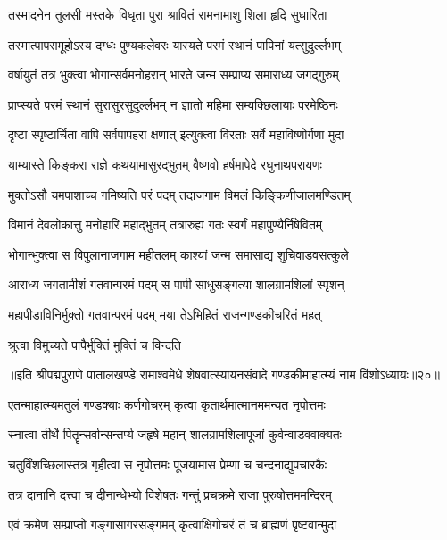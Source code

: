 \twolineshloka
{तस्मादनेन तुलसी मस्तके विधृता पुरा}
{श्रावितं रामनामाशु शिला हृदि सुधारिता}%

\twolineshloka
{तस्मात्पापसमूहोऽस्य दग्धः पुण्यकलेवरः}
{यास्यते परमं स्थानं पापिनां यत्सुदुर्ल्लभम्}%

\twolineshloka
{वर्षायुतं तत्र भुक्त्वा भोगान्सर्वमनोहरान्}
{भारते जन्म सम्प्राप्य समाराध्य जगद्गुरुम्}%

\twolineshloka
{प्राप्स्यते परमं स्थानं सुरासुरसुदुर्ल्लभम्}
{न ज्ञातो महिमा सम्यक्छिलायाः परमेष्ठिनः}%

\twolineshloka
{दृष्टा स्पृष्टार्चिता वापि सर्वपापहरा क्षणात्}
{इत्युक्त्वा विरताः सर्वे महाविष्णोर्गणा मुदा}%

\twolineshloka
{याम्यास्ते किङ्करा राज्ञे कथयामासुरद्भुतम्}
{वैष्णवो हर्षमापेदे रघुनाथपरायणः}%

\twolineshloka
{मुक्तोऽसौ यमपाशाच्च गमिष्यति परं पदम्}
{तदाजगाम विमलं किङ्किणीजालमण्डितम्}%

\twolineshloka
{विमानं देवलोकात्तु मनोहारि महाद्भुतम्}
{तत्रारुह्य गतः स्वर्गं महापुण्यैर्निषेवितम्}%

\twolineshloka
{भोगान्भुक्त्वा स विपुलानाजगाम महीतलम्}
{काश्यां जन्म समासाद्य शुचिवाडवसत्कुले}%

\twolineshloka
{आराध्य जगतामीशं गतवान्परमं पदम्}
{स पापी साधुसङ्गत्या शालग्रामशिलां स्पृशन्}%

\twolineshloka
{महापीडाविनिर्मुक्तो गतवान्परमं पदम्}
{मया तेऽभिहितं राजन्गण्डकीचरितं महत्}%

\onelineshloka
{श्रुत्वा विमुच्यते पापैर्भुक्तिं मुक्तिं च विन्दति}%

॥इति श्रीपद्मपुराणे पातालखण्डे रामाश्वमेधे शेषवात्स्यायनसंवादे गण्डकीमाहात्म्यं नाम विंशोऽध्यायः॥२०॥



\twolineshloka
{एतन्माहात्म्यमतुलं गण्डक्याः कर्णगोचरम्}
{कृत्वा कृतार्थमात्मानममन्यत नृपोत्तमः}%

\twolineshloka
{स्नात्वा तीर्थे पितॄन्सर्वान्सन्तर्प्य जहृषे महान्}
{शालग्रामशिलापूजां कुर्वन्वाडववाक्यतः}%

\twolineshloka
{चतुर्विंशच्छिलास्तत्र गृहीत्वा स नृपोत्तमः}
{पूजयामास प्रेम्णा च चन्दनाद्युपचारकैः}%

\twolineshloka
{तत्र दानानि दत्त्वा च दीनान्धेभ्यो विशेषतः}
{गन्तुं प्रचक्रमे राजा पुरुषोत्तममन्दिरम्}%

\twolineshloka
{एवं क्रमेण सम्प्राप्तो गङ्गासागरसङ्गमम्}
{कृत्वाक्षिगोचरं तं च ब्राह्मणं पृष्टवान्मुदा}%

